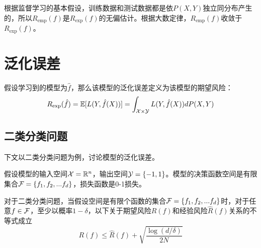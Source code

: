 根据监督学习的基本假设，训练数据和测试数据都是依$P(X,Y)$独立同分布产生的，所以$R_{\operatorname{emp}}(f)$是$R_{\exp}(f)$的无偏估计。根据大数定律，$R_{\operatorname{emp}}(f)$收敛于$R_{\exp}(f)$。

\section{泛化误差}
假设学习到的模型为$\hat{f}$，那么该模型的泛化误差定义为该模型的期望风险：
\[
	R_{\exp}(\hat{f})	=\mathbb{E} [ L(Y,\hat{f}(X)) ] = \int_{{\mathcal{X}} \times {\mathcal{Y}}} L(Y,\hat{f}(X)) d P(X,Y)
\]


\subsection{二类分类问题}
下文以二类分类问题为例，讨论模型的泛化误差。

假设模型的输入空间${\mathcal{X}}=\mathbb{R}^n$，输出空间${\mathcal{Y}} =\{-1,1\}$。模型的决策函数空间是有限集合${\mathcal{F}}=\{f_1,f_2,...f_d\}$，损失函数是0-1损失。

\begin{theorem}
	对于二类分类问题，当假设空间是有限个函数的集合${\mathcal{F}}=\{f_1,f_2,...f_d \}$时，对于任意$f \in {\mathcal{F}}$，至少以概率$1-\delta$，以下关于期望风险$R(f)$和经验风险$\hat{R}(f)$关系的不等式成立
	\[
		R(f) \le \hat{R}(f) + \sqrt{\frac{\log(d/ \delta)}{2N} }	
	\]

\end{theorem}
  
\clearpage 
    